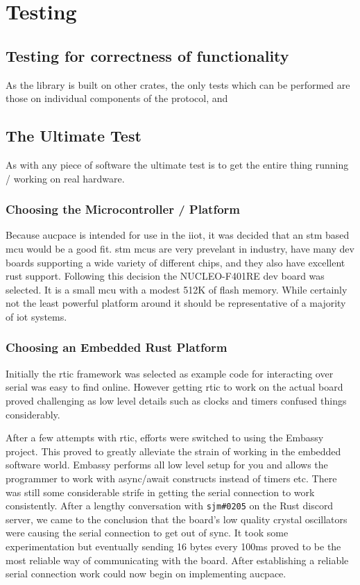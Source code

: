 \chapter{Testing}
\label{chap:testing}

\section{Testing for correctness of functionality}
As the library is built on other crates, the only tests which can be performed are those on individual components of the protocol, and 

\section{The Ultimate Test}
As with any piece of software the ultimate test is to get the entire thing running / working on real hardware.

\subsection{Choosing the Microcontroller / Platform}
Because \gls{aucpace} is intended for use in the \gls{iiot}, it was decided that an \gls{stm} based \gls{mcu} would be a good fit.
\gls{stm} \glspl{mcu} are very prevelant in industry, have many dev boards supporting a wide variety of different chips, and they also have excellent rust support.
Following this decision the NUCLEO-F401RE dev board was selected.
It is a small \gls{mcu} with a modest 512K of flash memory.
While certainly not the least powerful platform around it should be representative of a majority of \gls{iot} systems.

\subsection{Choosing an Embedded Rust Platform}
Initially the \gls{rtic} framework was selected as example code for interacting over serial was easy to find online.
However getting \gls{rtic} to work on the actual board proved challenging as low level details such as clocks and timers confused things considerably.

After a few attempts with \gls{rtic}, efforts were switched to using the Embassy project.
This proved to greatly alleviate the strain of working in the embedded software world.
Embassy performs all low level setup for you and allows the programmer to work with async/await constructs instead of timers etc.
There was still some considerable strife in getting the serial connection to work consistently.
After a lengthy conversation with \texttt{sjm\#0205} on the Rust discord server, we came to the conclusion that the board's low quality crystal oscillators were causing the serial connection to get out of sync.
It took some experimentation but eventually sending 16 bytes every 100ms proved to be the most reliable way of communicating with the board.
After establishing a reliable serial connection work could now begin on implementing \gls{aucpace}.

